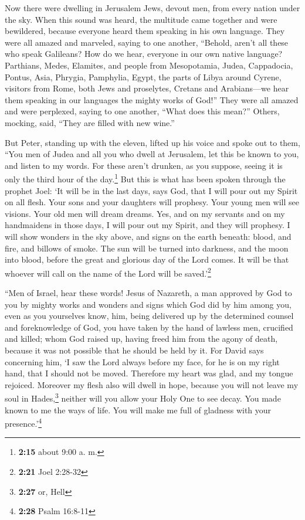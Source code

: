  Now there were dwelling in Jerusalem Jews, devout men,
from every nation under the sky.  When this sound was
heard, the multitude came together and were bewildered, because everyone
heard them speaking in his own language.  They were all
amazed and marveled, saying to one another, ``Behold, aren't all these
who speak Galileans?  How do we hear, everyone in our own
native language?  Parthians, Medes, Elamites, and people
from Mesopotamia, Judea, Cappadocia, Pontus, Asia, 
Phrygia, Pamphylia, Egypt, the parts of Libya around Cyrene, visitors
from Rome, both Jews and proselytes,  Cretans and
Arabians---we hear them speaking in our languages the mighty works of
God!''  They were all amazed and were perplexed, saying
to one another, ``What does this mean?''  Others,
mocking, said, ``They are filled with new wine.''

 But Peter, standing up with the eleven, lifted up his
voice and spoke out to them, ``You men of Judea and all you who dwell at
Jerusalem, let this be known to you, and listen to my words.
 For these aren't drunken, as you suppose, seeing it is
only the third hour of the day.\footnote{\textbf{2:15} about 9:00 a. m.}
 But this is what has been spoken through the prophet
Joel:  `It will be in the last days, says God, that I
will pour out my Spirit on all flesh. Your sons and your daughters will
prophesy. Your young men will see visions. Your old men will dream
dreams.  Yes, and on my servants and on my handmaidens in
those days, I will pour out my Spirit, and they will prophesy.
 I will show wonders in the sky above, and signs on the
earth beneath: blood, and fire, and billows of smoke. 
The sun will be turned into darkness, and the moon into blood, before
the great and glorious day of the Lord comes.  It will be
that whoever will call on the name of the Lord will be
saved.'\footnote{\textbf{2:21} Joel 2:28-32}

 ``Men of Israel, hear these words! Jesus of Nazareth, a
man approved by God to you by mighty works and wonders and signs which
God did by him among you, even as you yourselves know, 
him, being delivered up by the determined counsel and foreknowledge of
God, you have taken by the hand of lawless men, crucified and killed;
 whom God raised up, having freed him from the agony of
death, because it was not possible that he should be held by it.
 For David says concerning him, `I saw the Lord always
before my face, for he is on my right hand, that I should not be moved.
 Therefore my heart was glad, and my tongue rejoiced.
Moreover my flesh also will dwell in hope,  because you
will not leave my soul in Hades,\footnote{\textbf{2:27} or, Hell}
neither will you allow your Holy One to see decay.  You
made known to me the ways of life. You will make me full of gladness
with your presence.'\footnote{\textbf{2:28} Psalm 16:8-11}

